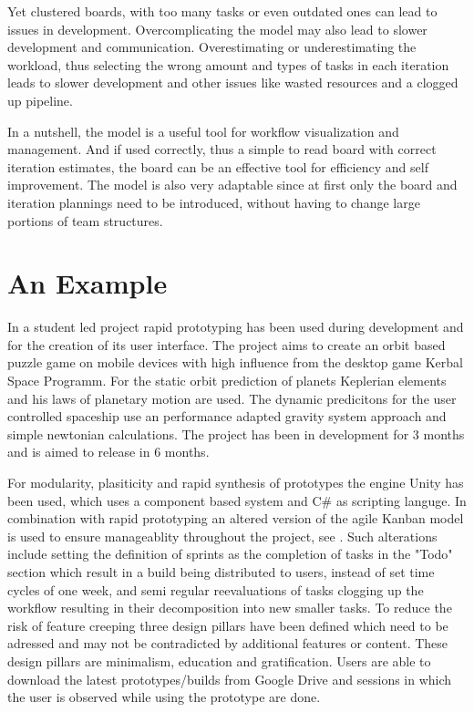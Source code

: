 \documentclass[runningheads]{llncs}
\begin{document}
Yet clustered boards, with too many tasks or even outdated ones can lead to issues in development. Overcomplicating the model may 
also lead to slower development and communication. Overestimating or underestimating the workload, thus selecting the wrong amount and
types of tasks in each iteration leads to slower development and other issues like wasted resources and a clogged up pipeline.

In a nutshell, the model is a useful tool for workflow visualization and management. And if used correctly, thus a simple to read board 
with correct iteration estimates, the board can be an effective tool for efficiency and self improvement. The model is also very adaptable 
since at first only the board and iteration plannings need to be introduced, without having to change large portions of team structures.


\section{An Example}
In a student led project rapid prototyping has been used during development and for the creation of its user interface. 
The project aims to create an orbit based puzzle game on mobile devices with high influence from the desktop game 
Kerbal Space Programm. For the static orbit prediction of planets Keplerian elements and his laws of planetary motion
are used. The dynamic predicitons for the user controlled spaceship use an performance adapted gravity system approach
and simple newtonian calculations. The project has been in development for 3 months and is aimed to release in 6 months.

For modularity, plasiticity and rapid synthesis of prototypes the engine Unity has been used, which uses a component based system 
and C\# as scripting languge. In combination with rapid prototyping an altered version of the agile Kanban\cite{ref_kanban} model 
is used to ensure manageablity throughout the project, see . Such alterations include setting the definition of sprints as the completion of tasks
in the "Todo" section which result in a build being distributed to users, instead of set time cycles of one week, and
semi regular reevaluations of tasks clogging up the workflow resulting in their decomposition into new smaller tasks.
To reduce the risk of feature creeping three design pillars have been defined which need to be adressed and may not be contradicted
by additional features or content. These design pillars are minimalism, education and gratification. Users are able to 
download the latest prototypes/builds from Google Drive and sessions in which the user is observed while using the prototype are done.
\end{document}
